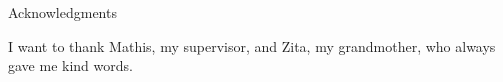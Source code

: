 \thispagestyle{empty}

\vspace*{20mm}

\begin{center}
    { Acknowledgments}
\end{center}

\vspace{10mm}

I want to thank Mathis, my supervisor, and Zita, my grandmother, who always gave me kind words.

\cleardoublepage{}
